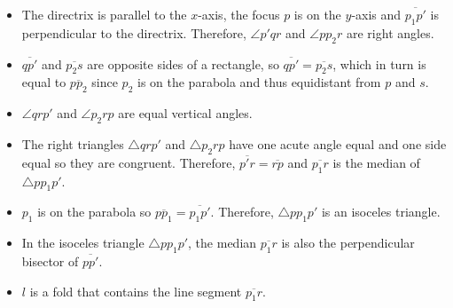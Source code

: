 \begin{itemize}
\item The directrix is parallel to the $x$-axis, the focus $p$ is on the $y$-axis and $\overline{p_1p'}$ is perpendicular to the directrix. Therefore, $\angle p'qr$ and $\angle pp_2r$ are right angles.
\item $\overline{qp'}$ and $\overline{p_2s}$ are opposite sides of a rectangle, so $\overline{qp'}=\overline{p_2s}$, which in turn is equal to $\overline{pp_2}$ since $p_2$ is on the parabola and thus equidistant from $p$ and $s$.
\item $\angle qrp'$ and $\angle p_2rp$ are equal vertical angles.
\item The right triangles $\triangle qrp'$ and $\triangle p_2rp$ have one acute angle equal and one side equal so they are congruent. Therefore, $\overline{p'r}=\overline{rp}$ and $\overline{p_1r}$ is the median of $\triangle pp_1p'$.
\item $p_1$ is on the parabola so $\overline{pp_1}=\overline{p_1p'}$. Therefore, $\triangle pp_1p'$ is an isoceles triangle.
\item In the isoceles triangle $\triangle pp_1p'$, the median $\overline{p_1r}$ is also the perpendicular bisector of $\overline{pp'}$.
\item $l$ is a fold that contains the line segment $\overline{p_1r}$.
\end{itemize}

